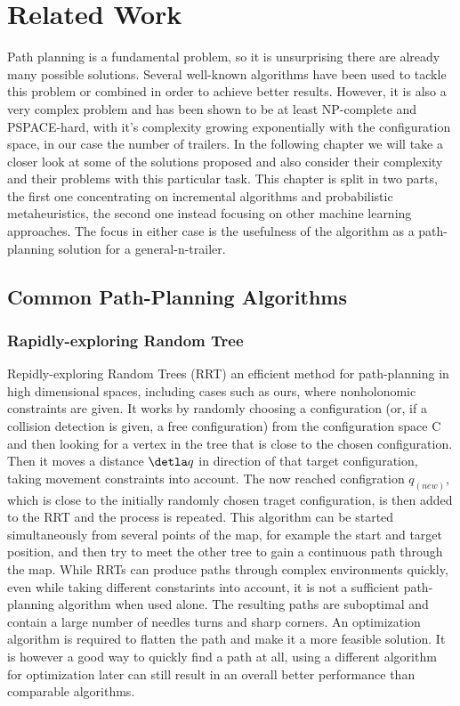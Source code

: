 \chapter{Related Work}
\label{cha:related_work}

Path planning is a fundamental problem, so it is unsurprising there are already many possible solutions. Several well-known algorithms have been used to tackle this problem or combined in order to achieve better results. However, it is also a very complex problem and has been shown to be at least NP-complete and PSPACE-hard, with it's complexity growing exponentially with the configuration space, in our case the number of trailers. \cite{1} In the following chapter we will take a closer look at some of the solutions proposed and also consider their complexity and their problems with this particular task. This chapter is split in two parts, the first one concentrating on incremental algorithms and probabilistic metaheuristics, the second one instead focusing on other machine learning approaches. The focus in either case is the usefulness of the algorithm as a path-planning solution for a general-n-trailer. \pagebreak[4]

\section{Common Path-Planning Algorithms}
\label{sec:common_pathplanning}

\subsection{Rapidly-exploring Random Tree}
\label{sec:rrt}

Repidly-exploring Random Trees (RRT) an efficient method for path-planning in high dimensional spaces, including cases such as ours, where nonholonomic constraints are given.\cite{33,34} It works by randomly choosing a configuration (or, if a collision detection is given, a free configuration) from the configuration space C and then looking for a vertex in the tree that is close to the chosen configuration. Then it moves a distance $\detla q$ in direction of that target configuration, taking movement constraints into account. The now reached configration $q_(new)$, which is close to the initially randomly chosen traget configuration, is then added to the RRT and the process is repeated. This algorithm can be started simultaneously from several points of the map, for example the start and target position, and then try to meet the other tree to gain a continuous path through the map. While RRTs can produce paths through complex environments quickly, even while taking different constarints into account, it is not a sufficient path-planning algorithm when used alone. The resulting paths are suboptimal and contain a large number of needles turns and sharp corners. An optimization algorithm is required to flatten the path and make it a more feasible solution. It is however a good way to quickly find a path at all, using a different algorithm for optimization later can still result in an overall better performance than comparable algorithms. 

